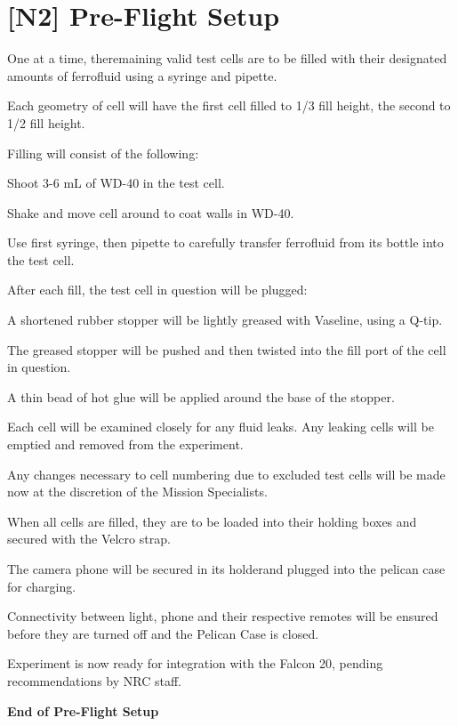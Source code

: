 \section{[N2] Pre-Flight Setup}
\begin{checklist}
	\item One at a time, theremaining valid test cells are to be filled with their designated amounts of ferrofluid using a syringe and pipette.
    \begin{checklist}
        \item Each geometry of cell will have the first cell filled to 1/3 fill height, the second to 1/2 fill height. 
        \item Filling will consist of the following:
        \begin{checklist}
			\item Shoot 3-6 mL of WD-40 in the test cell.
			\item Shake and move cell around to coat walls in WD-40.
			\item Use first syringe, then pipette to carefully transfer ferrofluid from its bottle into the test cell.
        \end{checklist}
    \end{checklist}
	\item After each fill, the test cell in question will be plugged:
    \begin{checklist}
		\item A shortened rubber stopper will be lightly greased with Vaseline, using a Q-tip.
		\item The greased stopper will be pushed and then twisted into the fill port of the cell in question.
		\item A thin bead of hot glue will be applied around the base of the stopper.
    \end{checklist}
	\item Each cell will be examined closely for any fluid leaks. Any leaking cells will be emptied and removed from the experiment.
	\item Any changes necessary to cell numbering due to excluded test cells will be made now at the discretion of the Mission Specialists. 
	\item When all cells are filled, they are to be loaded into their holding boxes and secured with the Velcro strap.
	\item The camera phone will be secured in its holderand plugged into the pelican case for charging.
	\item Connectivity between light, phone and their respective remotes will be ensured before they are turned off and the Pelican Case is closed. 
	\item Experiment is now ready for integration with the Falcon 20, pending recommendations by NRC staff. 
\end{checklist}
\textbf{End of Pre-Flight Setup}

